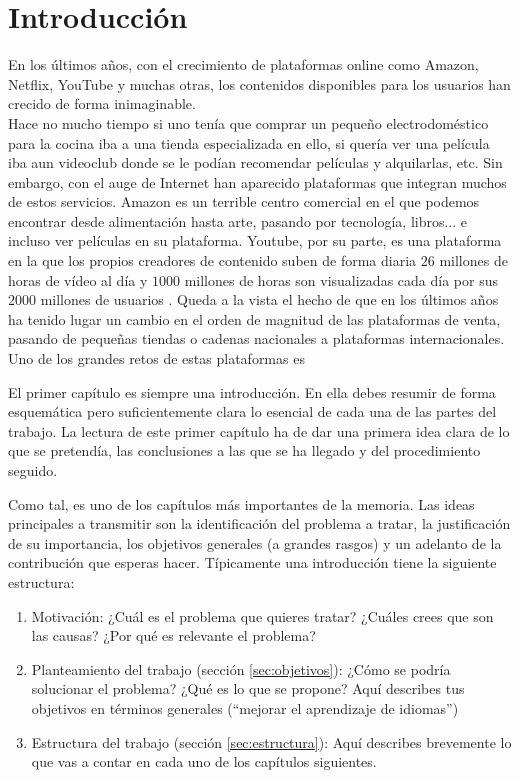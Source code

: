 \chapter{Introducción}\label{chap:introduccion}

En los últimos años, con el crecimiento de plataformas online como Amazon, Netflix, YouTube y muchas otras, los contenidos disponibles para los usuarios han crecido de forma inimaginable. \\

Hace no mucho tiempo si uno tenía que comprar un pequeño electrodoméstico para la cocina iba a una tienda especializada en ello, si quería ver una película iba aun videoclub donde se le podían recomendar películas y alquilarlas, etc. Sin embargo, con el auge de Internet han aparecido plataformas que integran muchos de estos servicios. Amazon es un terrible centro comercial en el que podemos encontrar desde alimentación hasta arte, pasando por tecnología, libros... e incluso ver películas en su plataforma. Youtube, por su parte, es una plataforma en la que los propios creadores de contenido suben de forma diaria $26$ millones de horas de vídeo al día y $1000$ millones de horas son visualizadas cada día por sus $2000$ millones de usuarios \cite{YoutubeStats}. Queda a la vista el hecho de que en los últimos años ha tenido lugar un cambio en el orden de magnitud de las plataformas de venta, pasando de pequeñas tiendas o cadenas nacionales a plataformas internacionales.\\

Uno de los grandes retos de estas plataformas es




El primer capítulo es siempre una introducción. En ella debes resumir de forma
esquemática pero suficientemente clara lo esencial de cada una de las partes del
trabajo. La lectura de este primer capítulo ha de dar una primera idea clara de lo que se pretendía, las conclusiones a las que se ha llegado y del procedimiento seguido.\par 
Como tal, es uno de los capítulos más importantes de la memoria. Las ideas principales a transmitir son la identificación del problema a tratar, la justificación de su importancia, los objetivos generales (a grandes rasgos) y un adelanto de la contribución que esperas hacer. Típicamente una introducción tiene la siguiente estructura:\par

\begin{enumerate}
    \item Motivación: ¿Cuál es el problema que quieres tratar? ¿Cuáles crees que son las causas? ¿Por qué es relevante el problema?
    \item Planteamiento del trabajo (sección \ref{sec:objetivos}): ¿Cómo se podría solucionar el problema? ¿Qué es lo que se propone? Aquí describes tus objetivos en términos generales (``mejorar el aprendizaje de idiomas'')
    \item Estructura del trabajo (sección \ref{sec:estructura}): Aquí describes brevemente lo que vas a contar en cada uno de los capítulos siguientes.
\end{enumerate}

